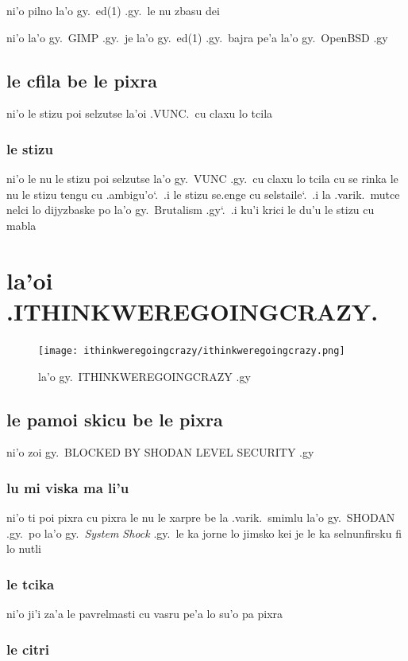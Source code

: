 \documentclass{report}
\newcommand\sds{\spacefactor\sfcode`.\ \space}
\begin{document}
ni'o pilno la'o gy.\ ed(1) .gy.\ le nu zbasu dei

ni'o la'o gy.\ GIMP .gy.\ je la'o gy.\ ed(1) .gy.\ bajra pe'a la'o gy.\ OpenBSD .gy

\section{le cfila be le pixra}
ni'o le stizu poi selzutse la'oi .VUNC.\ cu claxu lo tcila

\subsection{le stizu}
ni'o le nu le stizu poi selzutse la'o gy.\ VUNC .gy.\ cu claxu lo tcila cu se rinka le nu le stizu tengu cu .ambigu'o\sds  .i le stizu se.enge cu selstaile\sds  .i la .varik.\ mutce nelci lo dijyzbaske po la'o gy.\ Brutalism .gy\sds  .i ku'i krici le du'u le stizu cu mabla

\chapter{la'oi .ITHINKWEREGOINGCRAZY.}
\begin{figure}[ht]
	\centering
	\texttt{[image: ithinkweregoingcrazy/ithinkweregoingcrazy.png]}
	\caption[center]{la'o gy.\ ITHINKWEREGOINGCRAZY .gy}
\end{figure}
\section{le pamoi skicu be le pixra}
ni'o zoi gy.\ BLOCKED BY SHODAN LEVEL SECURITY .gy

\subsection{lu mi viska ma li'u}
ni'o ti poi pixra cu pixra le nu le xarpre be la .varik.\ smimlu la'o gy.\ SHODAN .gy.\ po la'o gy.\ \textit{System Shock} .gy.\ le ka jorne lo jimsko kei je le ka selnunfirsku fi lo nutli

\subsection{le tcika}
ni'o ji'i za'a le pavrelmasti cu vasru pe'a lo su'o pa pixra

\subsection{le citri}
\end{document}
